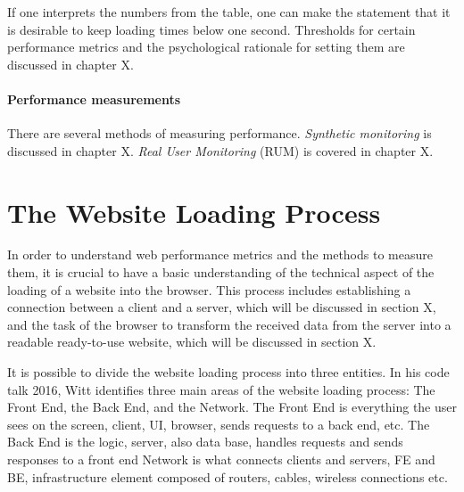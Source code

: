 If one interprets the numbers from the table, one can make the statement that it is desirable to keep loading times below one second.
Thresholds for certain performance metrics and the psychological rationale for setting them are discussed in chapter X. %





\paragraph{Performance measurements}

There are several methods of measuring performance.
\textit{Synthetic monitoring }is discussed in chapter X.
\textit{Real User Monitoring} (RUM) is covered in chapter X.











\section{The Website Loading Process}



In order to understand web performance metrics and the methods to measure them, it is crucial to have a basic understanding of the technical aspect of the loading of a website into the browser.
This process includes establishing a connection between a client and a server, which will be discussed in section X, and the task of the browser to transform the received data from the server into a readable ready-to-use website, which will be discussed in section X.



It is possible to divide the website loading process into three entities.
In his code talk 2016, Witt identifies three main areas of the website loading process: The Front End, the Back End, and the Network.  %
The Front End is everything the user sees on the screen, client, UI, browser, sends requests to a back end, etc.
The Back End is the logic, server, also data base, handles requests and sends responses to a front end
Network is what connects clients and servers, FE and BE, infrastructure element composed of routers, cables, wireless connections etc.

